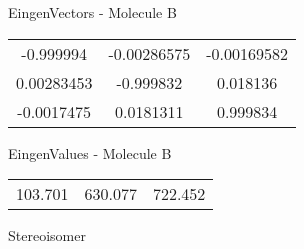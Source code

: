 \begin{multicols}{2}
\begin{center}
\vtab
 EingenVectors - Molecule B     \\
\vtab
\begin{tabular}{|c c c|}
-0.999994	 & 	-0.00286575	 & 	-0.00169582	 \\
0.00283453	 & 	-0.999832	 & 	0.018136	 \\
-0.0017475	 & 	0.0181311	 & 	0.999834
\end{tabular}

\vtab
 EingenValues - Molecule B     \\
\vtab
\begin{tabular}{|c c c|}
103.701	 & 	630.077	 & 	722.452	 \\
\end{tabular}

\end{center}
\end{multicols}
\begin{center}
\vtab
\vtab
\textcolor{NavyBlue}{\Large Stereoisomer}
\end{center}

 \newpage

